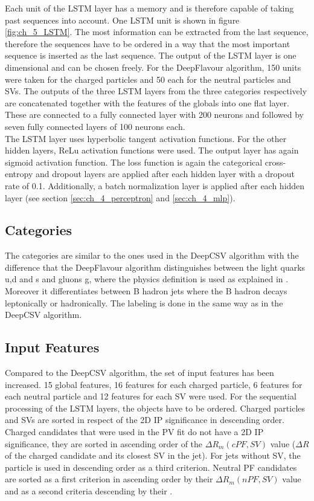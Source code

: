 Each unit of the LSTM layer has a memory and is therefore capable of taking past sequences into account. One LSTM unit is shown in figure \ref{fig:ch_5_LSTM}. The most information can be extracted from the last sequence, therefore the sequences have to be ordered in a way that the most important sequence is inserted as the last sequence. The output of the LSTM layer is one dimensional and can be chosen freely. For the DeepFlavour algorithm, 150 units were taken for the charged particles and 50 each for the neutral particles and SVs. The outputs of the three LSTM layers from the three categories respectively are concatenated together with the features of the globals into one flat layer. These are connected to a fully connected layer with 200 neurons and followed by seven fully connected layers of 100 neurons each.\\

The LSTM layer uses hyperbolic tangent activation functions. For the other hidden layers, ReLu activation functions were used. The output layer has again sigmoid activation function. The loss function is again the categorical cross-entropy and dropout layers are applied after each hidden layer with a dropout rate of 0.1. Additionally, a batch normalization layer is applied after each hidden layer (see section \ref{sec:ch_4_perceptron} and \ref{sec:ch_4_mlp}). 


\subsection{Categories}
The categories are similar to the ones used in the DeepCSV algorithm with the difference that the DeepFlavour algorithm distinguishes between the light quarks u,d and s and gluons g, where the physics definition is used as explained in \cite{MCTruth}. Moreover it differentiates between B hadron jets where the B hadron decays leptonically or hadronically. The labeling is done in the same way as in the DeepCSV algorithm.

\subsection{Input Features}
Compared to the DeepCSV algorithm, the set of input features has been increased. 15 global features, 16 features for each charged particle, 6 features for each neutral particle and 12 features for each SV were used. For the sequential processing of the LSTM layers, the objects have to be ordered. Charged particles and SVs are sorted in respect of the 2D IP significance in descending order. Charged candidates that were used in the PV fit do not have a 2D IP significance, they are sorted in ascending order of the $\Delta R_m(cPF,SV)$ value ($\Delta R$ of the charged candidate and its closest SV in the jet). For jets without SV, the particle \pt is used in descending order as a third criterion. Neutral PF candidates are sorted as a first criterion in ascending order by their $\Delta R_m(nPF,SV)$ value and as a second criteria descending by their {\pt}.

